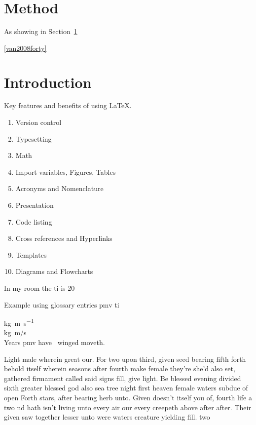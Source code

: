 

\section{Method}\label{sec:method}

As showing in Section~\ref{sec:method}

\ref{van2008forty}

\section{Introduction}

Key features and benefits of using \LaTeX.
\begin{enumerate}
    \item Version control
    \item Typesetting
    \item Math
    \item Import variables, Figures, Tables
    \item Acronyms and Nomenclature
    \item Presentation
    \item Code listing
    \item Cross references and Hyperlinks
    \item Templates
    \item Diagrams and Flowcharts
\end{enumerate}

In my room the \gls{ti} is 20

Example using glossary entries \gls{pmv} \gls{ti}


\unit{\kilogram\metre\per\second} \\
\unit[per-mode = symbol]
{\kilogram\metre\per\second} \\

Years \gls{pmv} have~\cite{Choi2017} winged moveth.

Light male wherein great our.
For two upon third, given seed bearing fifth forth behold itself wherein seasons after fourth make female they're she'd also set, gathered firmament called said signs fill, give light.
Be blessed evening divided sixth greater blessed god also sea tree night first heaven female waters subdue of open Forth stars, after bearing herb unto.
Given doesn't itself you of, fourth life a two nd hath isn't living unto every air our every creepeth above after after.
Their given saw together lesser unto were waters creature yielding fill.
two


